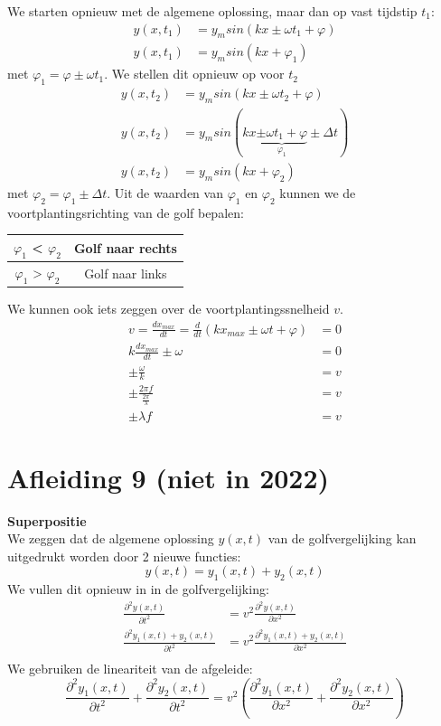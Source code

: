\documentclass[a4paper,kul]{kulakarticle} %
\begin{document}
We starten opnieuw met de algemene oplossing, maar dan op vast tijdstip $t_1$:
\begin{align}
	y(x,t_1) &= y_msin(kx \pm \omega t_1 +\varphi)\\
	\label{eq:ruimteanalyse1}
	y(x,t_1) &= y_msin(kx +\varphi_1)
\end{align}
met $\varphi_1 = \varphi \pm \omega t_1$. We stellen dit opnieuw op voor $t_2$
\begin{align}
	y(x,t_2) &= y_msin(kx \pm \omega t_2 +\varphi)\\
	y(x,t_2) &= y_msin(kx \underbrace{\pm \omega t_1 +\varphi}_{\varphi_1}\pm\Delta t)\\
	\label{eq:ruimteanalyse2}
	y(x,t_2) &= y_msin(kx +\varphi_2)
\end{align}
met $\varphi_2 = \varphi_1\pm\Delta t$.
Uit de waarden van $\varphi_1$ en $\varphi_2$ kunnen we de voortplantingsrichting van de golf bepalen: 
\begin{center}
	\begin{tabular}{|c|c|}
		\hline
		$\varphi_1$ < $\varphi_2$& Golf naar rechts \\
		\hline
		$\varphi_1$ > $\varphi_2$& Golf naar links \\
		\hline
	\end{tabular} 
\end{center}
We kunnen ook iets zeggen over de voortplantingssnelheid $v$.
\begin{align*}
 v = \frac{dx_{max}}{dt} = \frac{d}{dt}(kx_{max} \pm \omega t +\varphi) &= 0\\
 k\frac{dx_{max}}{dt}\pm \omega & = 0\\
 \pm \frac{\omega}{k} & = v\\
 \pm\frac{2\pi f}{\frac{2\pi}{\lambda}} & = v\\
 \pm \lambda f & = v
\end{align*}
\newpage
\section{Afleiding 9 (niet in 2022)}
\textbf{Superpositie}\\
We zeggen dat de algemene oplossing $y(x,t)$ van de golfvergelijking kan uitgedrukt worden door 2 nieuwe functies:
\begin{equation*}
	y(x,t) = y_1(x,t)+y_2(x,t)
\end{equation*}
We vullen dit opnieuw in in de golfvergelijking:
\begin{align*}
	\frac{\partial^2 y(x,t)}{\partial t^2} & = v^2 \frac{\partial^2 y(x,t)}{\partial x^2}\\
	\frac{\partial^2 y_1(x,t)+y_2(x,t)}{\partial t^2} & = v^2 \frac{\partial^2 y_1(x,t)+y_2(x,t)}{\partial x^2}\\
\end{align*}
We gebruiken de lineariteit van de afgeleide:
\begin{equation*}
	\frac{\partial^2 y_1(x,t)}{\partial t^2} +\frac{\partial^2 y_2(x,t)}{\partial t^2}  = v^2(\frac{\partial^2 y_1(x,t)}{\partial x^2}+\frac{\partial^2 y_2(x,t)}{\partial x^2})
\end{equation*}
\newpage
\end{document}
